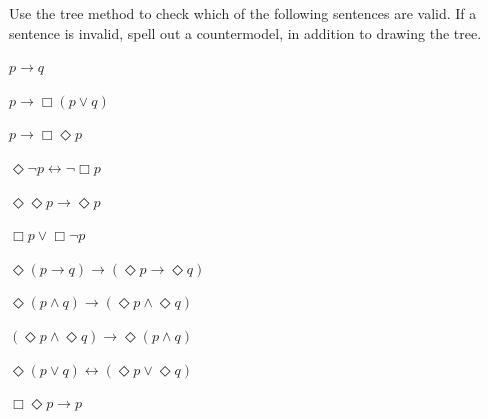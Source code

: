 \begin{exercise}
  Use the tree method to check which of the following sentences are valid. If a
  sentence is invalid, spell out a countermodel, in addition to drawing the
  tree.
  \begin{exlist}
  \item $p\to q$  %
  \item $p \to \Box(p \lor q)$  %
  \item $p \to \Box\Diamond p$  %
  \item $\Diamond \neg p \leftrightarrow \neg \Box p$  %
  \item $\Diamond\Diamond p \to \Diamond p$  %
  \item $\Box p \lor \Box \neg p$  %
  \item $\Diamond(p \to q) \to (\Diamond p \to \Diamond q)$  %
  \item $\Diamond(p \land q) \to (\Diamond p \land \Diamond q)$  %
  \item $(\Diamond p \land \Diamond q) \to \Diamond(p \land q)$  %
  \item $\Diamond(p \lor q) \leftrightarrow (\Diamond p \lor \Diamond q)$  %
  \item $\Box \Diamond p \to p$  %
  \end{exlist}
\end{exercise}
